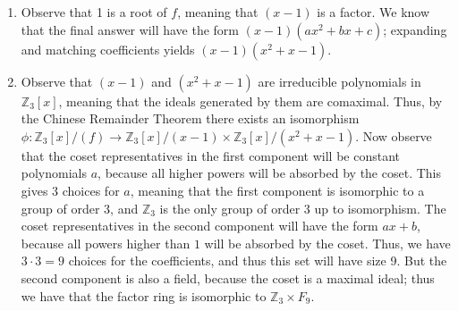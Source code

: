\documentclass{article}
\begin{document}
\begin{enumerate}
\begin{enumerate}[label=(\arabic*)]
	\item Observe that 1 is a root of $f$, meaning that $(x-1)$ is a factor. We know that the
	final answer will have the form $(x-1)(ax^2 + bx + c)$; expanding and matching coefficients
	yields $(x-1)(x^2 + x - 1)$.	
	\item Observe that $(x-1)$ and $(x^2 + x - 1)$ are irreducible polynomials in 
	$\mathbb{Z}_3[x]$, meaning that the ideals generated by them are comaximal. Thus, by the
	Chinese Remainder Theorem there exists an isomorphism $\phi \colon \mathbb{Z}_3[x]/(f) \to 
	\mathbb{Z}_3[x]/(x-1) \times \mathbb{Z}_3[x]/(x^2 + x - 1)$. Now observe that the coset 
	representatives in the first component will be constant polynomials $a$, because all higher
	powers will be absorbed by the coset. This gives 3 choices for $a$, meaning that the
	first component is isomorphic to a group of order 3, and $\mathbb{Z}_3$ is the only group
	of order 3 up to isomorphism. The coset representatives in the second component will have
	the form $ax + b$, because all powers higher than $1$ will be absorbed by the coset. Thus,
	we have $3 \cdot 3 = 9$ choices for the coefficients, and thus this set will have size 9. 
	But the second component is also a field, because the coset is a maximal ideal; thus we have 	that the factor ring is isomorphic to $\mathbb{Z}_3 \times F_9$.
\end{enumerate}
\fi


\end{enumerate}
\end{document}
